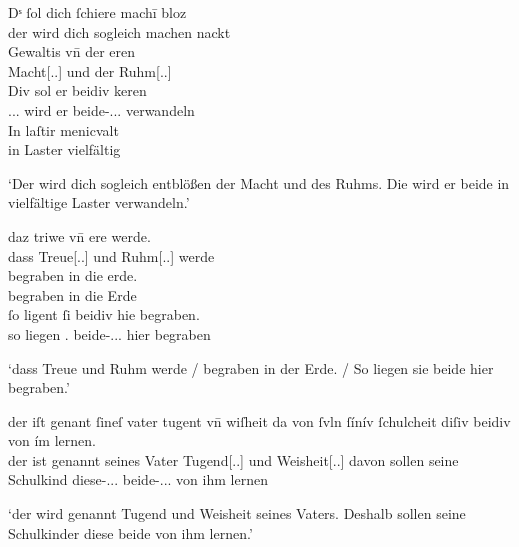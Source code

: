 \begin{exe}
\ex \label{ex:beid2p2combrem}
	\begin{xlist}
	\ex \label{ex:beid2p2combrem_1}
		\gll Dˢ ſol dich ſchiere machī bloz \\
			der wird dich sogleich machen nackt \\
	\sn \gll Gewaltis vn̄ der eren \\
			Macht[\Gen.\Sg.\FemI] und der Ruhm[\Gen.\Pl.\FemI] \\
	\sn \gll Div sol er beidiv keren \\
			\Dem.\Acc.\Pl.\NeutI{} wird er beide-\Acc.\Pl.\NeutI.\St{}
			verwandeln \\
	\sn \gll In laſtir menicvalt \\
			in Laster vielfältig \\
		\begin{taggedline}{\parencite[\nopp M317, V.~13020--13023]{rem}}
		\trans `Der wird dich sogleich entblößen der Macht und des Ruhms.
			Die wird er beide in vielfältige Laster verwandeln.'
		\end{taggedline}

	\ex \label{ex:beid2p2combrem_2}
		\gll daz triwe vn̄ ere werde. \\
			dass Treue[\Nom.\Sg.\FemI] und Ruhm[\Nom.\Sg.\FemI] werde \\
	\sn \gll begraben in die erde. \\
			begraben in die Erde \\
	\sn \gll ſo ligent ſi beidiv hie begraben. \\
			so liegen \Tpl\subI.\Nom{} beide-\Nom.\Pl.\NeutI.\St{} hier
			begraben \\
		\begin{taggedline}{\parencite[\nopp M342, V.~18661--18663]{rem}}
		\trans `dass Treue und Ruhm werde / begraben in der Erde. / So
			liegen sie beide hier begraben.'
		\end{taggedline}

	\ex \label{ex:beid2p2combrem_3}
		\gll der iſt genant ſineſ vater tugent vn̄ wiſheit
			{da von} ſvln ſínív ſchulcheit\upshape\footnotemark{} diſiv
			beidiv von ím lernen. \\
			der ist genannt seines Vater Tugend[\Nom.\Sg.\FemI] und
			Weisheit[\Nom.\Sg.\FemI] davon sollen seine Schulkind
			diese-\Acc.\Pl.\NeutI.\St{} beide-\Acc.\Pl.\NeutI.\St{} von ihm
			lernen \\
		\begin{taggedline}{\parencite[\nopp M401, Bl.~108\vo, 19--21]{rem}}
		\trans `der wird genannt Tugend und Weisheit seines Vaters.
			Deshalb sollen seine Schulkinder diese beide von ihm lernen.'
		\end{taggedline}
	\end{xlist}
\end{exe}
